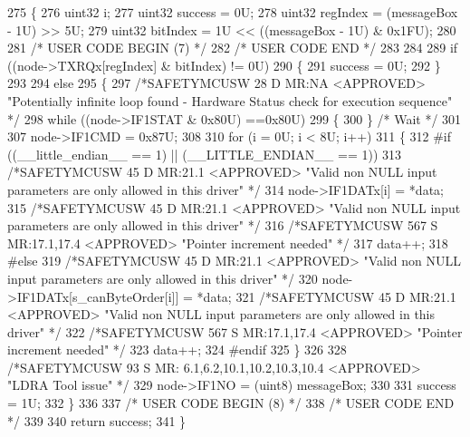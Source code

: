 \begin{DoxyCode}
275 \{
276     uint32 i;
277     uint32 success  = 0U;
278     uint32 regIndex = (messageBox - 1U) >> 5U;
279     uint32 bitIndex = 1U << ((messageBox - 1U) & 0x1FU);
280 
281 \textcolor{comment}{/* USER CODE BEGIN (7) */}
282 \textcolor{comment}{/* USER CODE END */}
283 
284 
289     \textcolor{keywordflow}{if} ((node->TXRQx[regIndex] & bitIndex) != 0U)
290     \{
291         success = 0U;
292     \}
293 
294     \textcolor{keywordflow}{else}
295     \{
297     \textcolor{comment}{/*SAFETYMCUSW 28 D MR:NA <APPROVED> "Potentially infinite loop found - Hardware Status check for
       execution sequence" */}
298     \textcolor{keywordflow}{while} ((node->IF1STAT & 0x80U) ==0x80U)
299     \{ 
300     \} \textcolor{comment}{/* Wait */}
301     
307     node->IF1CMD = 0x87U;
308     
310     \textcolor{keywordflow}{for} (i = 0U; i < 8U; i++)
311     \{
312 \textcolor{preprocessor}{#if ((\_\_little\_endian\_\_ == 1) || (\_\_LITTLE\_ENDIAN\_\_ == 1))
}
313         \textcolor{comment}{/*SAFETYMCUSW 45 D MR:21.1 <APPROVED> "Valid non NULL input parameters are only allowed in this
       driver" */}
314         node->IF1DATx[i] = *data;
315         \textcolor{comment}{/*SAFETYMCUSW 45 D MR:21.1 <APPROVED> "Valid non NULL input parameters are only allowed in this
       driver" */}
316         \textcolor{comment}{/*SAFETYMCUSW 567 S MR:17.1,17.4 <APPROVED> "Pointer increment needed" */}
317         data++;
318 \textcolor{preprocessor}{#else
}
319         \textcolor{comment}{/*SAFETYMCUSW 45 D MR:21.1 <APPROVED> "Valid non NULL input parameters are only allowed in this
       driver" */}
320         node->IF1DATx[s\_canByteOrder[i]] = *data;
321         \textcolor{comment}{/*SAFETYMCUSW 45 D MR:21.1 <APPROVED> "Valid non NULL input parameters are only allowed in this
       driver" */}
322         \textcolor{comment}{/*SAFETYMCUSW 567 S MR:17.1,17.4 <APPROVED> "Pointer increment needed" */}
323         data++;
324 \textcolor{preprocessor}{#endif
}
325     \}
326 
328     \textcolor{comment}{/*SAFETYMCUSW 93 S MR: 6.1,6.2,10.1,10.2,10.3,10.4 <APPROVED> "LDRA Tool issue" */}
329     node->IF1NO = (uint8) messageBox;
330 
331     success = 1U; 
332     \}
336 
337 \textcolor{comment}{/* USER CODE BEGIN (8) */}
338 \textcolor{comment}{/* USER CODE END */}
339 
340     \textcolor{keywordflow}{return} success;
341 \}
\end{DoxyCode}
\mbox{\label{group__CAN_ga6a2ea37d107b5e26bb3f7628ef2c7ee7}} 
